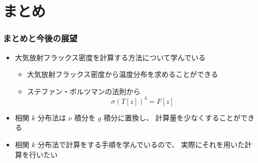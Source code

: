 \documentclass[unicode,colorlinks]{beamer}
\begin{document}
% 

\section{まとめ}

\begin{frame}
	\frametitle{まとめと今後の展望}
	\begin{itemize}
		\item 大気放射フラックス密度を計算する方法について学んでいる
		\begin{itemize}
			\item 大気放射フラックス密度から温度分布を求めることができる
			\item ステファン・ボルツマンの法則から
				\[\sigma(T[z])^4=F[z]\]
		\end{itemize}
		\item 相関 $k$ 分布法は $\nu$ 積分を $g$ 積分に置換し、
			計算量を少なくすることができる
	\end{itemize}
	
	\begin{itemize}
		\item 相関 $k$ 分布法で計算をする手順を学んでいるので、
			実際にそれを用いた計算を行いたい
	\end{itemize}
\end{frame}
\end{document}
